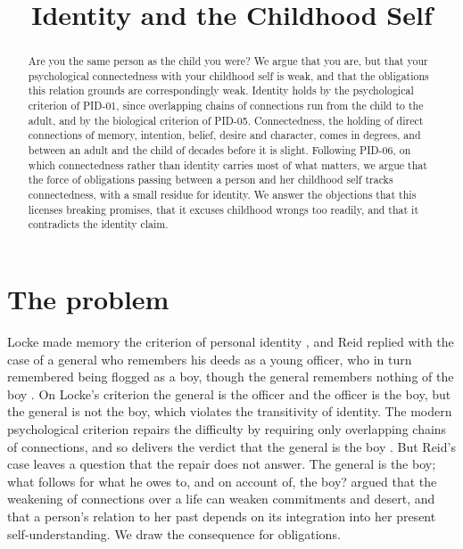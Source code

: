 \documentclass{situationist-preprint}
\title{Identity and the Childhood Self}
\begin{document}
\maketitle

\begin{abstract}
Are you the same person as the child you were? We argue that you are, but that your psychological connectedness with your childhood self is weak, and that the obligations this relation grounds are correspondingly weak. Identity holds by the psychological criterion of PID-01, since overlapping chains of connections run from the child to the adult, and by the biological criterion of PID-05. Connectedness, the holding of direct connections of memory, intention, belief, desire and character, comes in degrees, and between an adult and the child of decades before it is slight. Following PID-06, on which connectedness rather than identity carries most of what matters, we argue that the force of obligations passing between a person and her childhood self tracks connectedness, with a small residue for identity. We answer the objections that this licenses breaking promises, that it excuses childhood wrongs too readily, and that it contradicts the identity claim.
\end{abstract}

\section{The problem}

Locke made memory the criterion of personal identity \citep[II.xxvii]{Locke1694}, and Reid replied with the case of a general who remembers his deeds as a young officer, who in turn remembered being flogged as a boy, though the general remembers nothing of the boy \citep[III.6]{Reid1785}. On Locke's criterion the general is the officer and the officer is the boy, but the general is not the boy, which violates the transitivity of identity. The modern psychological criterion repairs the difficulty by requiring only overlapping chains of connections, and so delivers the verdict that the general is the boy \citep{Parfit1984}. But Reid's case leaves a question that the repair does not answer. The general is the boy; what follows for what he owes to, and on account of, the boy? \citet[ch.~15]{Parfit1984} argued that the weakening of connections over a life can weaken commitments and desert, and \citet{Schechtman1996} that a person's relation to her past depends on its integration into her present self-understanding. We draw the consequence for obligations.
\end{document}
